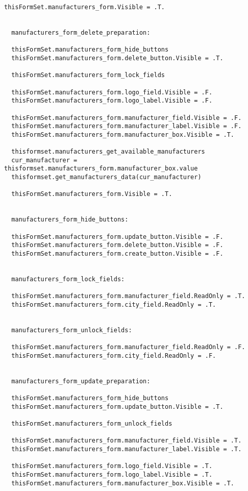 \begin{lstlisting}[caption=crud\_formset\_procedures]
  thisFormSet.manufacturers_form.Visible = .T.


  manufacturers_form_delete_preparation:

  thisFormSet.manufacturers_form_hide_buttons
  thisFormSet.manufacturers_form.delete_button.Visible = .T.

  thisFormSet.manufacturers_form_lock_fields

  thisFormSet.manufacturers_form.logo_field.Visible = .F.
  thisFormSet.manufacturers_form.logo_label.Visible = .F.

  thisFormSet.manufacturers_form.manufacturer_field.Visible = .F.
  thisFormSet.manufacturers_form.manufacturer_label.Visible = .F.
  thisFormSet.manufacturers_form.manufacturer_box.Visible = .T.

  thisformset.manufacturers_get_available_manufacturers
  cur_manufacturer = thisformset.manufacturers_form.manufacturer_box.value
  thisformset.get_manufacturers_data(cur_manufacturer)

  thisFormSet.manufacturers_form.Visible = .T.


  manufacturers_form_hide_buttons:

  thisFormSet.manufacturers_form.update_button.Visible = .F.
  thisFormSet.manufacturers_form.delete_button.Visible = .F.
  thisFormSet.manufacturers_form.create_button.Visible = .F.


  manufacturers_form_lock_fields:

  thisFormSet.manufacturers_form.manufacturer_field.ReadOnly = .T.
  thisFormSet.manufacturers_form.city_field.ReadOnly = .T.


  manufacturers_form_unlock_fields:

  thisFormSet.manufacturers_form.manufacturer_field.ReadOnly = .F.
  thisFormSet.manufacturers_form.city_field.ReadOnly = .F.


  manufacturers_form_update_preparation:

  thisFormSet.manufacturers_form_hide_buttons
  thisFormSet.manufacturers_form.update_button.Visible = .T.

  thisFormSet.manufacturers_form_unlock_fields

  thisFormSet.manufacturers_form.manufacturer_field.Visible = .T.
  thisFormSet.manufacturers_form.manufacturer_label.Visible = .T.

  thisFormSet.manufacturers_form.logo_field.Visible = .T.
  thisFormSet.manufacturers_form.logo_label.Visible = .T.
  thisFormSet.manufacturers_form.manufacturer_box.Visible = .T.


\end{lstlisting}
